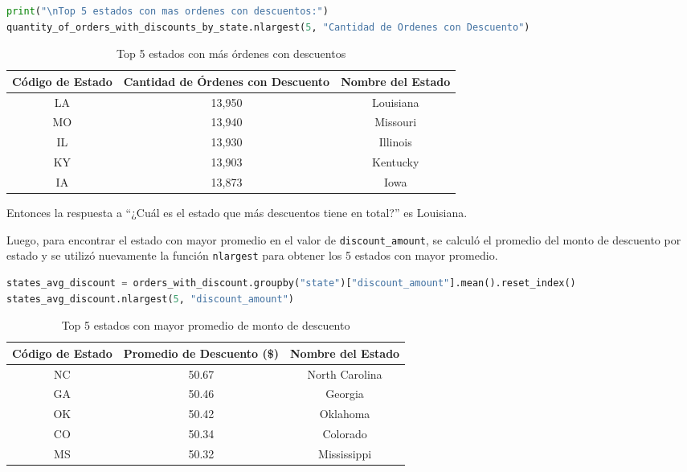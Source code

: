 \begin{lstlisting}[language=Python, xleftmargin=35pt, xrightmargin=35pt]
print("\nTop 5 estados con mas ordenes con descuentos:")
quantity_of_orders_with_discounts_by_state.nlargest(5, "Cantidad de Ordenes con Descuento")
\end{lstlisting}
\begin{table}[H]
\centering

\begin{tabular}{|c|c|c|}
\hline
\textbf{Código de Estado} & \textbf{Cantidad de Órdenes con Descuento} & \textbf{Nombre del Estado} \\
\hline
LA & 13,950 & Louisiana \\
MO & 13,940 & Missouri \\
IL & 13,930 & Illinois \\
KY & 13,903 & Kentucky \\
IA & 13,873 & Iowa \\
\hline
\end{tabular}
\caption{Top 5 estados con más órdenes con descuentos}
\end{table}

Entonces la respuesta a ``¿Cuál es el estado que más descuentos tiene en total?'' es Louisiana.

Luego, para encontrar el estado con mayor promedio en el valor de \texttt{discount\_amount}, se calculó el promedio del monto de descuento por estado y se utilizó nuevamente la función \texttt{nlargest} para obtener los 5 estados con mayor promedio.

\begin{lstlisting}[language=Python, xleftmargin=26pt, xrightmargin=26pt]
states_avg_discount = orders_with_discount.groupby("state")["discount_amount"].mean().reset_index()
states_avg_discount.nlargest(5, "discount_amount")
\end{lstlisting}

\begin{table}[H]
\centering
\begin{tabular}{|c|c|c|}
\hline
\textbf{Código de Estado} & \textbf{Promedio de Descuento (\$)} & \textbf{Nombre del Estado} \\
\hline
NC & 50.67 & North Carolina \\
GA & 50.46 & Georgia \\
OK & 50.42 & Oklahoma \\
CO & 50.34 & Colorado \\
MS & 50.32 & Mississippi \\
\hline
\end{tabular}
\caption{Top 5 estados con mayor promedio de monto de descuento}
\end{table}

